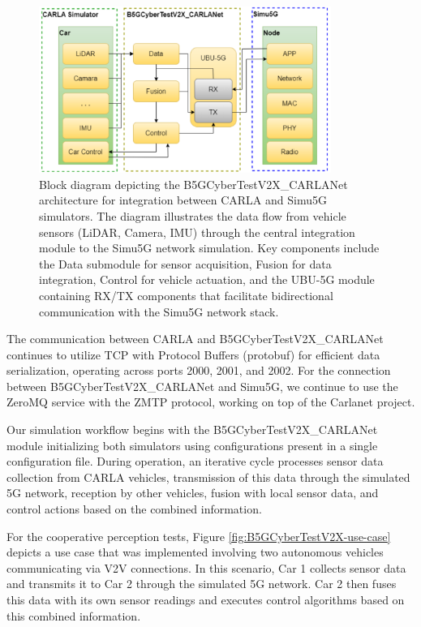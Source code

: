 \begin{figure} [!ht]
    \centering
    \includegraphics[width=0.85\textwidth]{parts/figuras/B5GCyberTestV2X_CARLANet.png}
    \caption{Block diagram depicting the B5GCyberTestV2X\_CARLANet architecture for integration between CARLA and Simu5G simulators. The diagram illustrates the data flow from vehicle sensors (LiDAR, Camera, IMU) through the central integration module to the Simu5G network simulation. Key components include the Data submodule for sensor acquisition, Fusion for data integration, Control for vehicle actuation, and the UBU-5G module containing RX/TX components that facilitate bidirectional communication with the Simu5G network stack.}
    \label{fig:B5GCyberTestV2X}
\end{figure}

The communication between CARLA and B5GCyberTestV2X\_CARLANet continues to utilize TCP with Protocol Buffers (protobuf) for efficient data serialization, operating across ports 2000, 2001, and 2002. For the connection between B5GCyberTestV2X\_CARLANet and Simu5G, we continue to use the ZeroMQ service with the ZMTP protocol, working on top of the Carlanet project.

Our simulation workflow begins with the B5GCyberTestV2X\_CARLANet module initializing both simulators using configurations present in a single configuration file. During operation, an iterative cycle processes sensor data collection from CARLA vehicles, transmission of this data through the simulated 5G network, reception by other vehicles, fusion with local sensor data, and control actions based on the combined information. 

For the cooperative perception tests, Figure \ref{fig:B5GCyberTestV2X-use-case} depicts a use case that was implemented involving two autonomous vehicles communicating via V2V connections. In this scenario, Car 1 collects sensor data and transmits it to Car 2 through the simulated 5G network. Car 2 then fuses this data with its own sensor readings and executes control algorithms based on this combined information. 

